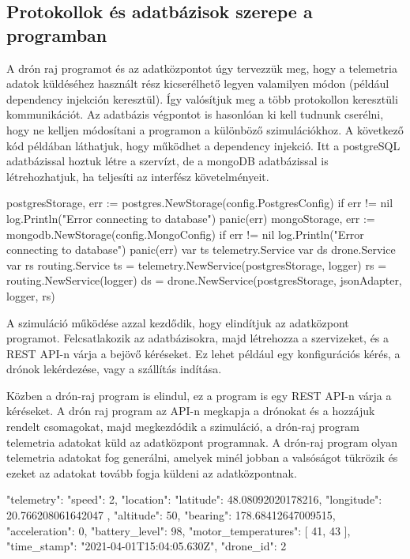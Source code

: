 \subsection{Protokollok és adatbázisok szerepe a programban}
A drón raj programot és az adatközpontot úgy tervezzük meg, hogy a telemetria adatok küldéséhez használt rész kicserélhető legyen valamilyen módon (például dependency injekción keresztül).
Így valósítjuk meg a több protokollon keresztüli kommunikációt. Az adatbázis végpontot is hasonlóan ki kell tudnunk cserélni, hogy ne kelljen módosítani a programon a különböző szimulációkhoz.
A következő kód példában láthatjuk, hogy működhet a dependency injekció. Itt a postgreSQL adatbázissal hoztuk létre a szervízt, de a mongoDB adatbázissal is létrehozhatjuk, ha teljesíti az interfész követelményeit.
\begin{python}
    postgresStorage, err := postgres.NewStorage(config.PostgresConfig)
    if err != nil {
        log.Println("Error connecting to database")
        panic(err)
    }
    mongoStorage, err := mongodb.NewStorage(config.MongoConfig)
    if err != nil {
        log.Println("Error connecting to database")
        panic(err)
    }
    var ts telemetry.Service
    var ds drone.Service
    var rs routing.Service
    ts = telemetry.NewService(postgresStorage, logger)
    rs = routing.NewService(logger)
    ds = drone.NewService(postgresStorage, jsonAdapter, logger, rs)
\end{python}


A szimuláció működése azzal kezdődik, hogy elindítjuk az adatközpont programot.
Felcsatlakozik az adatbázisokra, majd létrehozza a szervizeket, és a REST API-n várja a bejövő kéréseket.
Ez lehet például egy konfigurációs kérés, a drónok lekérdezése, vagy a szállítás indítása.

Közben a drón-raj program is elindul, ez a program is egy REST API-n várja a kéréseket.
A drón raj program az API-n megkapja a drónokat és a hozzájuk rendelt csomagokat, majd megkezdódik a szimuláció, a drón-raj program telemetria adatokat küld az adatközpont programnak.
A drón-raj program olyan telemetria adatokat fog generálni, amelyek minél jobban a valsóságot tükrözik és ezeket az adatokat tovább fogja küldeni az adatközpontnak.
\begin{python}
{
    "telemetry": {
    "speed": 2,
    "location": {
    "latitude": 48.08092020178216,
    "longitude": 20.766208061642047
    },
    "altitude": 50,
    "bearing": 178.68412647009515,
    "acceleration": 0,
    "battery_level": 98,
    "motor_temperatures": [
    41,
    43
    ],
    "time_stamp": "2021-04-01T15:04:05.630Z",
    "drone_id": 2
    }
}
\end{python}

